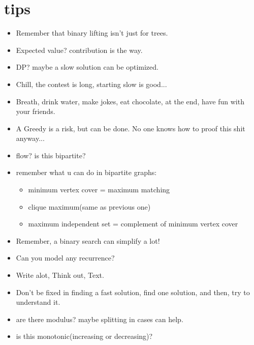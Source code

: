     \section{tips}
    \begin{itemize}
    \item Remember that binary lifting isn't just for trees.
    
    \item Expected value? contribution is the way.
    
    \item DP? maybe a slow solution can be optimized.
    
    \item Chill, the contest is long, starting slow is good...
    
    \item Breath, drink water, make jokes, eat chocolate, at the end, have fun with your friends.
    
    \item A Greedy is a risk, but can be done. No one knows how to proof this shit anyway...
    \item flow? is this bipartite?
    \item remember what u can do in bipartite graphs:
    \begin{itemize}
        \item minimum vertex cover = maximum matching
        \item clique maximum(same as previous one) 
        \item maximum independent set = complement of minimum vertex cover
    \end{itemize}
    
    \item Remember, a binary search can simplify a lot!

    \item Can you model any recurrence?

    \item Write alot, Think out, Text.

    \item Don't be fixed in finding a fast solution, find one solution, and then, try to understand it.

    \item are there modulus? maybe splitting in cases can help.

    \item is this monotonic(increasing or decreasing)?
    

\end{itemize}
